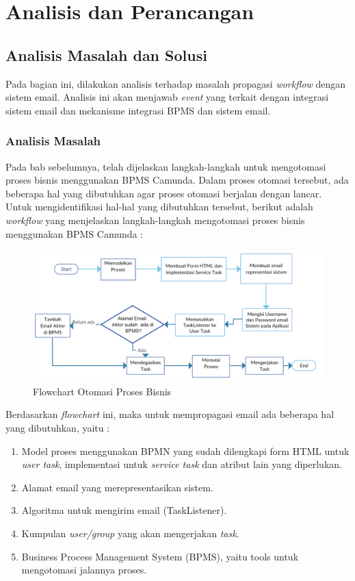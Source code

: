 \chapter{Analisis dan Perancangan}
\label{chap:analisisdanperancangan_hasilStudi}

\section{Analisis Masalah dan Solusi}
\label{sec:analisisdanperancangan_masalahdansolusi}
Pada bagian ini, dilakukan analisis terhadap masalah propagasi \textit{workflow} dengan sistem email. Analisis ini akan menjawab \textit{event} yang terkait dengan integrasi sistem email dan mekanisme integrasi BPMS dan sistem email.

\subsection{Analisis Masalah}
\label{analisisdanperancangan_analisismasalah}
Pada bab sebelumnya, telah dijelaskan langkah-langkah untuk mengotomasi proses bisnis menggunakan BPMS Camunda. Dalam proses otomasi tersebut, ada beberapa hal yang dibutuhkan agar proses otomasi berjalan dengan lancar. Untuk mengidentifikasi hal-hal yang dibutuhkan tersebut, berikut adalah \textit{workflow} yang menjelaskan langkah-langkah mengotomasi proses bisnis menggunakan BPMS Camunda :

		\begin{figure}[H]
			\centering
			\includegraphics[scale=0.4]{Gambar/Bab-4/HighLevelFlowchart}
			\caption{Flowchart Otomasi Proses Bisnis} 
			\label{fig:stepflowchart}
		\end{figure}

Berdasarkan \textit{flowchart} ini, maka untuk mempropagasi email ada beberapa hal yang dibutuhkan, yaitu :
\begin{enumerate}
	\item Model proses menggunakan BPMN yang sudah dilengkapi form HTML untuk \textit{user task}, implementasi untuk \textit{service task} dan atribut lain yang diperlukan.
	\item Alamat email yang merepresentasikan sistem.
	\item Algoritma untuk mengirim email (TaskListener).
	\item Kumpulan \textit{user/group} yang akan mengerjakan \textit{task}.
	\item Business Process Management System (BPMS), yaitu tools untuk mengotomasi jalannya proses.
\end{enumerate}


